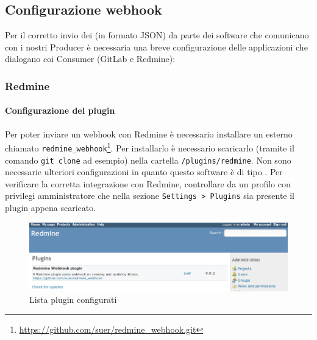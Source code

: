 \subsection{Configurazione webhook}
Per il corretto invio dei  (in formato JSON) da parte dei software che comunicano con i nostri Producer è necessaria una breve configurazione delle applicazioni che dialogano coi Consumer (GitLab e Redmine):
	
	\subsubsection{Redmine}
	\paragraph{Configurazione del plugin}
	Per poter inviare un webhook con Redmine è necessario installare un  esterno chiamato \texttt{redmine\_webhook}\footnote{\url{https://github.com/suer/redmine_webhook.git}}.
	Per installarlo è necessario scaricarlo (tramite il comando \texttt{git clone} ad esempio) nella cartella \texttt{/plugins/redmine}.
	Non sono necessarie ulteriori configurazioni in quanto questo software è di tipo . %
	Per verificare la corretta integrazione con Redmine, controllare da un profilo con privilegi amministratore che nella sezione \texttt{Settings > Plugins} sia presente il plugin appena scaricato.
	\begin{figure}[H]
		\centering
		\includegraphics[width=13cm]{img/redmine_webhook_admin.png}
		\caption{Lista plugin configurati}
	\end{figure}


